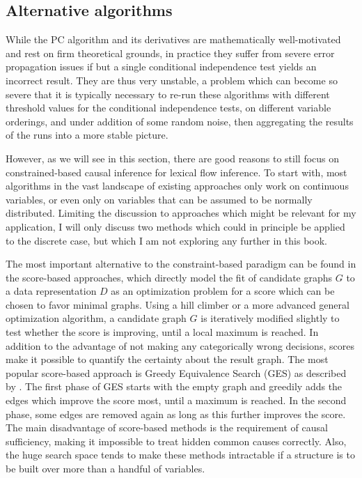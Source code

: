 \subsection{Alternative algorithms}\label{sec:3.2.5}
While the PC algorithm and its derivatives are mathematically well-motivated and rest on firm theoretical grounds, in practice they suffer from severe error propagation issues if but a single conditional independence test yields an incorrect result. They are thus very unstable, a problem which can become so severe that it is typically necessary to re-run these algorithms with different threshold values for the conditional independence tests, on different variable orderings, and under addition of some random noise, then aggregating the results of the runs into a more stable picture.

However, as we will see in this section, there are good reasons to still focus on constrained-based causal inference for lexical flow inference. To start with, most algorithms in the vast landscape of existing approaches only work on continuous variables, or even only on variables that can be assumed to be normally distributed. Limiting the discussion to approaches which might be relevant for my application, I will only discuss two methods which could in principle be applied to the discrete case, but which I am not exploring any further in this book.

The most important alternative to the constraint-based paradigm can be found in the score-based approaches, which directly model the fit of candidate graphs $G$ to a data representation $D$ as an optimization problem for a score which can be chosen to favor minimal graphs. Using a hill climber or a more advanced general optimization algorithm, a candidate graph $G$ is iteratively modified slightly to test whether the score is improving, until a local maximum is reached. In addition to the advantage of not making any categorically wrong decisions, scores make it possible to quantify the certainty about the result graph. The most popular score-based approach is Greedy Equivalence Search (GES) as described by \cite{chickering2002}. The first phase of GES starts with the empty graph and greedily adds the edges which improve the score most, until a maximum is reached. In the second phase, some edges are removed again as long as this further improves the score. The main disadvantage of score-based methods is the requirement of causal sufficiency, making it impossible to treat hidden common causes correctly. Also, the huge search space tends to make these methods intractable if a structure is to be built over more than a handful of variables.

